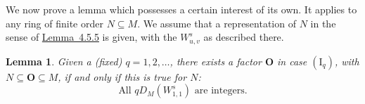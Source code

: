 \documentclass[b5paper,twoside]{article}
\newcommand{\lemref}[2]{\hyperref[#1]{\mbox{Lemma~#2}}}
\theoremstyle{mvnplain}
\newtheorem{lemma}{Lemma}[section]
\newcommand{\M}{\mathbf M}
\newcommand{\N}{\mathbf N}
\def\M{M}%
\def\N{N}%
\begin{document}
We now prove a lemma which possesses a certain interest of its own. It applies
to any ring of finite order \(\N\subseteq\M\). We assume that a representation
of \(\N\) in the sense of \lemref{lem:4.5.5}{4.5.5} is given, with the
\(W^s_{u,v}\) as described there.

\begin{lemma}\label{lem:4.5.6}
Given a (fixed) \(q=1,2,\ldots\), there exists a factor \(\mathbf O\) in case
\((\mathrm I_q)\), with \(\N\subseteq\mathbf O\subseteq\M\), if and only if
this is true for \(\N\):
\begin{equation}\tag{4.5.\(\gamma\)}\label{eq:4.5-gamma}
 \text{All }qD_{\M}(W^s_{1,1})\text{ are integers.}
\end{equation}
\end{lemma}
\end{document}
